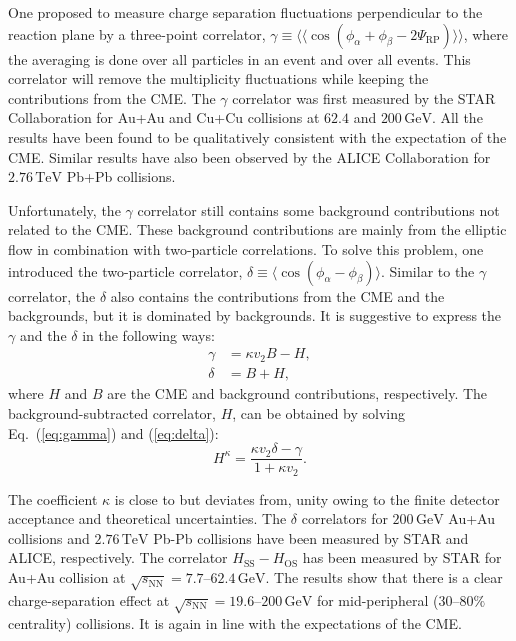\documentclass[a4paper,10pt,twoside]{cpc-hepnp}
\begin{document}
\begin{CJK*}{GBK}{song}
\begin{multicols}{2}
One proposed to measure charge separation fluctuations perpendicular to the reaction plane by a three-point correlator, $\gamma \equiv \langle \langle \cos(\phi_\alpha + \phi_\beta - 2 \Psi_\text{RP}) \rangle \rangle$, where the averaging is done over all particles in an event and over all events\cite{Voloshin:2004vk,Kharzeev:2007jp}. This correlator will remove the multiplicity fluctuations while keeping the contributions from the CME. The $\gamma$ correlator was first measured by the STAR Collaboration for Au+Au and Cu+Cu collisions at $62.4$ and $200\,\mathrm{GeV}$\cite{Abelev2009ac,Abelev:2009ad}. All the results have been found to be qualitatively consistent with the expectation of the CME. Similar results have also been observed by the ALICE Collaboration for $2.76\,\mathrm{TeV}$ Pb+Pb collisions\cite{PhysRevLett.110.012301}.

Unfortunately, the $\gamma$ correlator still contains some background contributions not related to the CME\cite{Schlichting:2010qia,Pratt:2010zn,Bzdak:2012ia}. These background contributions are mainly from the elliptic flow in combination with two-particle correlations. To solve this problem, one introduced the two-particle correlator, $\delta \equiv \langle \cos(\phi_\alpha - \phi_\beta) \rangle$. Similar to the $\gamma$ correlator, the $\delta$ also contains the contributions from the CME and the backgrounds, but it is dominated by backgrounds. It is suggestive to express the $\gamma$ and the $\delta$ in the following ways\cite{Bzdak:2012ia}:
\begin{align}
\gamma &= \kappa v_2 B - H, \label{eq:gamma} \\
\delta &= B + H, \label{eq:delta}
\end{align}
where $H$ and $B$ are the CME and background contributions, respectively. The background-subtracted correlator, $H$, can be obtained by solving Eq.~(\ref{eq:gamma}) and (\ref{eq:delta}):
\begin{equation}
H^\kappa = \frac{\kappa v_2 \delta - \gamma}{1 + \kappa v_2}.
\end{equation}

The coefficient $\kappa$ is close to but deviates from, unity owing to the finite detector acceptance and theoretical uncertainties\cite{Bzdak:2012ia}. The $\delta$ correlators for $200\,\mathrm{GeV}$ Au+Au collisions and $2.76\,\mathrm{TeV}$ Pb-Pb collisions have been measured by STAR\cite{Abelev:2009ad} and ALICE\cite{PhysRevLett.110.012301}, respectively. The correlator $H_\text{SS} - H_\text{OS}$ has been measured by STAR for Au+Au collision at $\sqrt{s_\text{NN}} = 7.7$--$62.4\,\mathrm{GeV}$\cite{Adamczyk:2014mzf}. The results show that there is a clear charge-separation effect at $\sqrt{s_\text{NN}} = 19.6$--$200\,\mathrm{GeV}$ for mid-peripheral ($30$--$80\%$ centrality) collisions. It is again in line with the expectations of the CME.



\end{multicols}
\end{CJK*}
\end{document}
